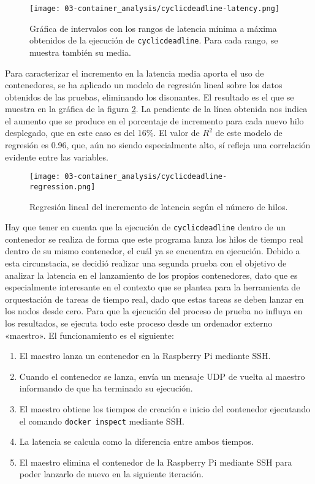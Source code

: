 \begin{figure}
    \centering
    \texttt{[image: 03-container\_analysis/cyclicdeadline-latency.png]}
    \caption{Gráfica de intervalos con los rangos de latencia mínima a máxima
        obtenidos de la ejecución de \texttt{cyclicdeadline}. Para cada rango, se
        muestra también su media.}
    \label{fig:03-cyclicdeadline_latency}
\end{figure}

Para caracterizar el incremento en la latencia media aporta el uso de
contenedores, se ha aplicado un modelo de regresión lineal sobre los datos
obtenidos de las pruebas, eliminando los disonantes. El resultado es el que se
muestra en la gráfica de la figura \ref{fig:03-cyclicdeadline_regression}. La
pendiente de la línea obtenida nos indica el aumento que se produce en el
porcentaje de incremento para cada nuevo hilo desplegado, que en este caso es
del 16\%. El valor de $R^{2}$ de este modelo de regresión es 0.96, que, aún no
siendo especialmente alto, sí refleja una correlación evidente entre las
variables.

\begin{figure}
    \centering
    \texttt{[image: 03-container\_analysis/cyclicdeadline-regression.png]}
    \caption{Regresión lineal del incremento de latencia según el número de hilos.}
    \label{fig:03-cyclicdeadline_regression}
\end{figure}

Hay que tener en cuenta que la ejecución de \texttt{cyclicdeadline} dentro de un
contenedor se realiza de forma que este programa lanza los hilos de tiempo real
dentro de su mismo contenedor, el cuál ya se encuentra en ejecución. Debido a
esta circunstacia, se decidió realizar una segunda prueba con el objetivo de
analizar la latencia en el lanzamiento de los propios contenedores, dato que es
especialmente interesante en el contexto que se plantea para la herramienta de
orquestación de tareas de tiempo real, dado que estas tareas se deben lanzar en
los nodos desde cero. Para que la ejecución del proceso de prueba no influya en
los resultados, se ejecuta todo este proceso desde un ordenador externo
«maestro». El funcionamiento es el siguiente:

\begin{enumerate}
    \item El maestro lanza un contenedor en la Raspberry Pi mediante SSH.
    \item Cuando el contenedor se lanza, envía un mensaje UDP de vuelta al
          maestro informando de que ha terminado su ejecución.
    \item El maestro obtiene los tiempos de creación e inicio del contenedor
          ejecutando el comando \texttt{docker inspect} mediante SSH.
    \item La latencia se calcula como la diferencia entre ambos tiempos.
    \item El maestro elimina el contenedor de la Raspberry Pi mediante SSH para
          poder lanzarlo de nuevo en la siguiente iteración.
\end{enumerate}

